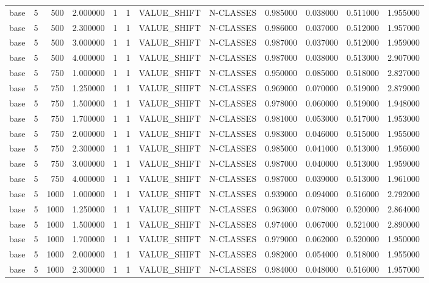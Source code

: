 \begin{tabular}{lrrrllllrrrr}
base & 5 & 500 & 2.000000 & 1 & 1 & VALUE_SHIFT & N-CLASSES & 0.985000 & 0.038000 & 0.511000 & 1.955000 \\
base & 5 & 500 & 2.300000 & 1 & 1 & VALUE_SHIFT & N-CLASSES & 0.986000 & 0.037000 & 0.512000 & 1.957000 \\
base & 5 & 500 & 3.000000 & 1 & 1 & VALUE_SHIFT & N-CLASSES & 0.987000 & 0.037000 & 0.512000 & 1.959000 \\
base & 5 & 500 & 4.000000 & 1 & 1 & VALUE_SHIFT & N-CLASSES & 0.987000 & 0.038000 & 0.513000 & 2.907000 \\
base & 5 & 750 & 1.000000 & 1 & 1 & VALUE_SHIFT & N-CLASSES & 0.950000 & 0.085000 & 0.518000 & 2.827000 \\
base & 5 & 750 & 1.250000 & 1 & 1 & VALUE_SHIFT & N-CLASSES & 0.969000 & 0.070000 & 0.519000 & 2.879000 \\
base & 5 & 750 & 1.500000 & 1 & 1 & VALUE_SHIFT & N-CLASSES & 0.978000 & 0.060000 & 0.519000 & 1.948000 \\
base & 5 & 750 & 1.700000 & 1 & 1 & VALUE_SHIFT & N-CLASSES & 0.981000 & 0.053000 & 0.517000 & 1.953000 \\
base & 5 & 750 & 2.000000 & 1 & 1 & VALUE_SHIFT & N-CLASSES & 0.983000 & 0.046000 & 0.515000 & 1.955000 \\
base & 5 & 750 & 2.300000 & 1 & 1 & VALUE_SHIFT & N-CLASSES & 0.985000 & 0.041000 & 0.513000 & 1.956000 \\
base & 5 & 750 & 3.000000 & 1 & 1 & VALUE_SHIFT & N-CLASSES & 0.987000 & 0.040000 & 0.513000 & 1.959000 \\
base & 5 & 750 & 4.000000 & 1 & 1 & VALUE_SHIFT & N-CLASSES & 0.987000 & 0.039000 & 0.513000 & 1.961000 \\
base & 5 & 1000 & 1.000000 & 1 & 1 & VALUE_SHIFT & N-CLASSES & 0.939000 & 0.094000 & 0.516000 & 2.792000 \\
base & 5 & 1000 & 1.250000 & 1 & 1 & VALUE_SHIFT & N-CLASSES & 0.963000 & 0.078000 & 0.520000 & 2.864000 \\
base & 5 & 1000 & 1.500000 & 1 & 1 & VALUE_SHIFT & N-CLASSES & 0.974000 & 0.067000 & 0.521000 & 2.890000 \\
base & 5 & 1000 & 1.700000 & 1 & 1 & VALUE_SHIFT & N-CLASSES & 0.979000 & 0.062000 & 0.520000 & 1.950000 \\
base & 5 & 1000 & 2.000000 & 1 & 1 & VALUE_SHIFT & N-CLASSES & 0.982000 & 0.054000 & 0.518000 & 1.955000 \\
base & 5 & 1000 & 2.300000 & 1 & 1 & VALUE_SHIFT & N-CLASSES & 0.984000 & 0.048000 & 0.516000 & 1.957000 \\

\end{tabular}
